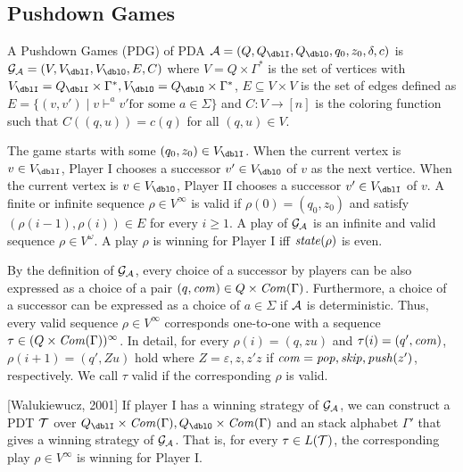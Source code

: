 \subsection{Pushdown Games}

\begin{definition}
A {Pushdown Games} (PDG) of PDA $\calA = (Q, Q_\dblI, Q_\dblO, q_0, z_0, \delta, c)$ is $\calG_\calA = (V, V_\dblI, V_\dblO, E, C)$ where
$V = Q\times\Gamma^*$ is the set of vertices with $V_\dblI = Q_\dblI\times\Gamma^*, V_\dblO = Q_\dblO\times\Gamma^*$, $E\subseteq V\times V$ is the set of edges defined as $E = \{(v,v') \mid v \vdash^a v' \text{for some $a\in \Sigma$}\}$
and $C: V \to [n]$ is the coloring function such that
$C((q,u)) = c(q)$ for all $(q,u)\in V$.
\end{definition}

The game starts with some $(q_0,z_0)\in V_\dblI$.
When the current vertex is $v\in V_\dblI$,
Player I chooses a successor $v'\in V_\dblO$ of $v$ as the next vertice.
When the current vertex is $v\in V_\dblO$,
Player II chooses a successor $v'\in V_\dblI$ of $v$.
A finite or infinite sequence $\rho\in V^\infty$ is valid if
$\rho(0)=(q_0,z_0)$ and satisfy
$(\rho(i-1), \rho(i))\in E$ for every $i\geq 1$.
A play of ${\cal G}_{\cal A}$ is an infinite and valid sequence $\rho\in V^\omega$.
A play $\rho$ is winning for Player I iff $\mathit{state}(\rho)$ is even.

By the definition of ${\cal G}_{\cal A}$,
every choice of a successor by players can be also expressed as
a choice of a pair $(q,\mathit{com})\in Q\times \mathit{Com}(\Gamma)$. Furthermore, a choice of a successor can be expressed as a choice of $a\in\Sigma$ if ${\cal A}$ is deterministic.
Thus, every valid sequence $\rho \in V^\infty$
corresponds one-to-one with a sequence $\tau\in (Q\times \mathit{Com}(\Gamma))^\infty$.
In detail, for every $\rho(i) = (q, zu)$ and $\tau(i) = (q', \mathit{com})$, $\rho(i+1) = (q', Zu)$ hold
where $Z=\varepsilon, z, z'z$ if $\mathit{com}=\mathit{pop},\mathit{skip},\mathit{push}(z')$, respectively.
We call $\tau$ valid if the corresponding $\rho$ is valid.

\begin{theorem}{[Walukiewucz, 2001]}
\label{the: wal}
If player I has a winning strategy of ${\cal G}_{\cal A}$,
we can construct a PDT ${\cal T}$ over $Q_\dblI\times\Com(\Gamma), Q_\dblO\times\Com(\Gamma)$ and an stack alphabet $\Gamma'$ that gives a winning strategy of ${\cal G}_{\cal A}$.
That is, for every $\tau\in L({\cal T})$, the corresponding play $\rho\in V^\infty$ is winning for Player I.
\end{theorem}

